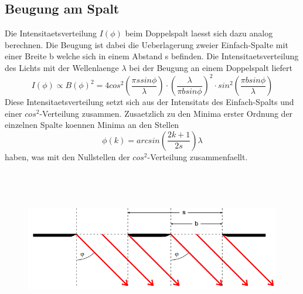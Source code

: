 \subsection{Beugung am Spalt}
Die Intensitaetsverteilung $I(\phi)$ beim Doppelspalt laesst sich dazu analog berechnen. Die Beugung ist dabei die Ueberlagerung zweier Einfach-Spalte mit einer Breite b welche sich in einem Abstand s befinden. Die Intensitaetsverteilung des Lichts mit der Wellenlaenge $\lambda$ bei der Beugung an einem Doppelspalt liefert
\begin{equation*}
    I(\phi)\varpropto B(\phi)^2=4cos^2(\frac{\pi ssin\phi}{\lambda})\cdot(\frac{\lambda}{\pi bsin\phi})^2\cdot sin^2(\frac{\pi bsin\phi}{\lambda})
\end{equation*}
Diese Intensitaetsverteilung setzt sich aus der Intensitats des Einfach-Spalts und einer $cos^2$-Verteilung zusammen. Zusaetzlich zu den Minima erster Ordnung der einzelnen Spalte koennen Minima an den Stellen
\begin{equation*}
    \phi(k)=arcsin(\frac{2k+1}{2s})\lambda
\end{equation*} 
haben, was mit den Nullstellen der $cos^2$-Verteilung zusammenfaellt.
\begin{figure}[H]
    \centering
    \captionsetup{justification=centering}
    \includegraphics[height=7cm]{"Doppelspalt_BeugungSpalt.png"}
    \label{Fig:Doppelspalt}
\end{figure}
